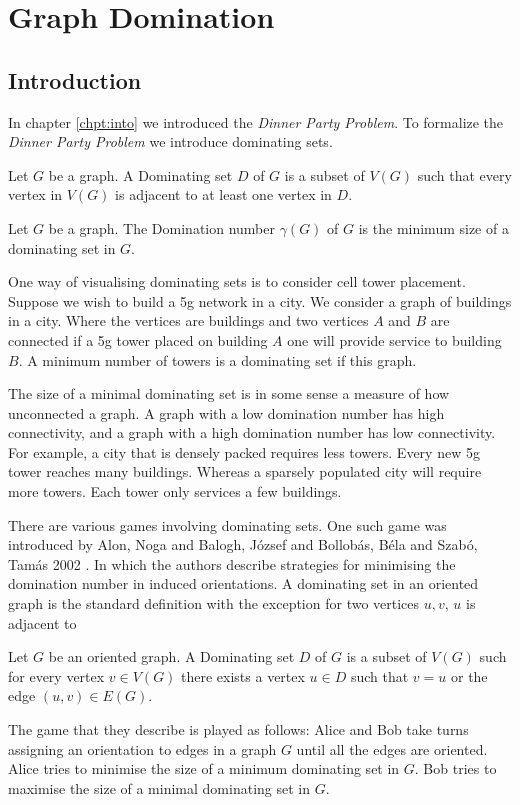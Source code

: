 \chapter{Graph Domination}\label{chpt:domSet}

\section{Introduction}

In chapter \ref{chpt:into} we introduced the \textit{Dinner Party Problem}. To formalize the \textit{Dinner Party Problem} we introduce dominating sets. 

\begin{definition}
    Let $G$ be a graph. A Dominating set $D$ of $G$ is a subset of $V(G)$ such that every vertex in $V(G)$ is adjacent to at least one vertex in $D$.
\end{definition} 
\begin{definition}
    Let $G$ be a graph. The Domination number $\gamma(G)$ of $G$ is the minimum size of a dominating set in $G$.
\end{definition}

One way of visualising dominating sets is to consider cell tower placement. Suppose we wish to build a 5g network in a city. We consider a graph of buildings in a city. Where the vertices are buildings and two vertices $A$ and $B$ are connected if a 5g tower placed on building $A$ one will provide service to building $B$. A minimum number of towers is a dominating set if this graph.

The size of a minimal dominating set is in some sense a measure of how unconnected a graph. A graph with a low domination number has high connectivity, and a graph with a high domination number has low connectivity. For example, a city that is densely packed requires less towers. Every new 5g tower reaches many buildings. Whereas a sparsely populated city will require more towers. Each tower only services a few buildings.   

There are various games involving dominating sets. One such game was introduced by  Alon, Noga and Balogh, J\'{o}zsef and Bollob\'{a}s, B\'{e}la and Szab\'{o}, Tam\'{a}s 2002 \cite{AlBABoSz2002}. In which the authors describe strategies for minimising the domination number in induced orientations. A dominating set in an oriented graph is the standard definition with the exception for two vertices $u,v$, $u$ is adjacent to  
\begin{definition}
    Let $G$ be an oriented graph.  A Dominating set $D$ of $G$ is a subset of $V(G)$ such for every vertex $v\in V(G)$ there exists a vertex $u\in D$ such that $v=u$ or the edge $(u,v)\in E(G)$. 
\end{definition}
The game that they describe is played as follows: Alice and Bob take turns assigning an orientation to edges in a graph $G$ until all the edges are oriented. Alice tries to minimise the size of a minimum dominating set in $G$. Bob tries to maximise the size of a minimal dominating set in $G$.     


